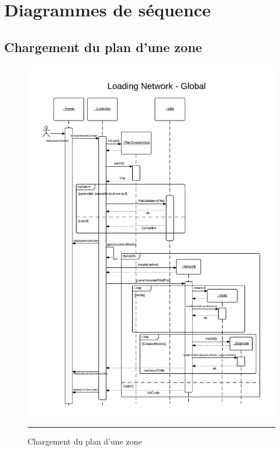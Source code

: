 \section{Diagrammes de séquence}

\subsection{Chargement du plan d'une zone}
\begin{figure}[H]
	\centering
		\includegraphics[width=\textwidth,height=\textheight,keepaspectratio]{Figures/plan_zone}
		\rule{35em}{0.5pt}
	\caption[Chargement du plan d'une zone]{Chargement du plan d'une zone}
\end{figure}

